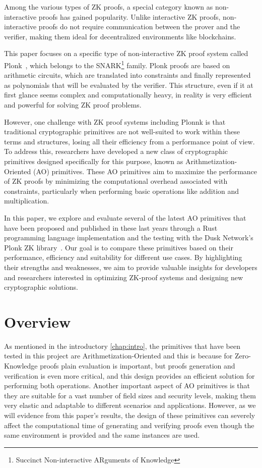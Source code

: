\documentclass[12pt, a4paper]{report}
\begin{document}
Among the various types of ZK proofs, a special category known as non-interactive proofs has gained popularity.
Unlike interactive ZK proofs, non-interactive proofs do not require communication between the prover and the verifier, making them ideal for decentralized environments like blockchains.

This paper focuses on a specific type of non-interactive ZK proof system called \textsf{Plonk}~\cite{plonk}, which belongs to the SNARK\footnote{Succinct Non-interactive ARguments of Knowledge} family.
\textsf{Plonk} proofs are based on arithmetic circuits, which are translated into constraints and finally represented as polynomials that will be evaluated by the verifier.
This structure, even if it at first glance seems complex and computationally heavy, in reality is very efficient and powerful for solving ZK proof problems.

However, one challenge with ZK proof systems including \textsf{Plonnk} is that traditional cryptographic primitives are not well-suited to work within these terms and structures, losing all their efficiency from a performance point of view.
To address this, researchers have developed a new class of cryptographic primitives designed specifically for this purpose, known as Arithmetization-Oriented (AO) primitives.
These AO primitives aim to maximize the performance of ZK proofs by minimizing the computational overhead associated with constraints, particularly when performing basic operations like addition and multiplication.

In this paper, we explore and evaluate several of the latest AO primitives that have been proposed and published in these last years through a Rust programming language implementation and the testing with the Dusk Network's \textsf{Plonk} ZK library~\cite{dusk-plonk}.
Our goal is to compare these primitives based on their performance, efficiency and suitability for different use cases.
By highlighting their strengths and weaknesses, we aim to provide valuable insights for developers and researchers interested in optimizing ZK-proof systems and designing new cryptographic solutions.

\chapter{Overview}\label{chap:overview}

As mentioned in the introductory \autoref{chap:intro}, the primitives that have been tested in this project are Arithmetization-Oriented and this is because for Zero-Knowledge proofs plain evaluation is important, but proofs generation and verification is even more critical, and this design provides an efficient solution for performing both operations.
Another important aspect of AO primitives is that they are suitable for a vast number of field sizes and security levels, making them very elastic and adaptable to different scenarios and applications.
However, as we will evidence from this paper's results, the design of these primitives can severely affect the computational time of generating and verifying proofs even though the same environment is provided and the same instances are used.
\end{document}
